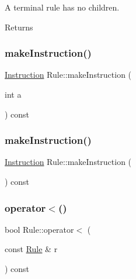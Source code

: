A terminal rule has no children. \begin{DoxyReturn}{Returns}

\end{DoxyReturn}
\mbox{\label{class_rule_a87d9e666dd70af3b4a8df2e2411cbe32}} 
\subsubsection{\texorpdfstring{make\+Instruction()}{makeInstruction()}\hspace{0.1cm}{\footnotesize\ttfamily [1/2]}}
{\footnotesize\ttfamily \hyperlink{struct_instruction}{Instruction} Rule\+::make\+Instruction (\begin{DoxyParamCaption}\item[{int}]{a }\end{DoxyParamCaption}) const\hspace{0.3cm}{\ttfamily [inline]}}

\mbox{\label{class_rule_a6518d9c0da87dade8e8620dea94506ab}} 
\subsubsection{\texorpdfstring{make\+Instruction()}{makeInstruction()}\hspace{0.1cm}{\footnotesize\ttfamily [2/2]}}
{\footnotesize\ttfamily \hyperlink{struct_instruction}{Instruction} Rule\+::make\+Instruction (\begin{DoxyParamCaption}{ }\end{DoxyParamCaption}) const\hspace{0.3cm}{\ttfamily [inline]}}

\mbox{\label{class_rule_a706819fbede2c5a1b0b59f1d28cae30b}} 
\subsubsection{\texorpdfstring{operator$<$()}{operator<()}}
{\footnotesize\ttfamily bool Rule\+::operator$<$ (\begin{DoxyParamCaption}\item[{const \hyperlink{class_rule}{Rule} \&}]{r }\end{DoxyParamCaption}) const\hspace{0.3cm}{\ttfamily [inline]}}


